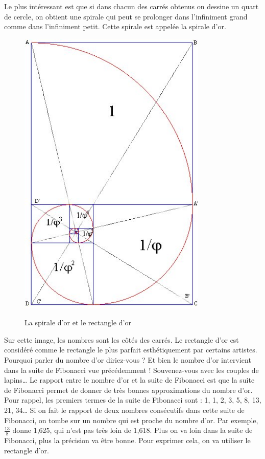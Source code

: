 \documentclass[french,11pt]{report}
\begin{document}
Le plus intéressant est que si dans chacun des carrés obtenus on dessine un quart de cercle, on obtient une spirale qui peut se prolonger dans l’infiniment grand comme dans l’infiniment petit. Cette spirale est appelée la spirale d’or.
\vspace*{60mm}
\begin{figure} [!h]
    \centering
    \includegraphics[width=9cm]{spirale_or}
    \label{fig:spirale_or}
    \caption{La spirale d'or et le rectangle d'or}
\end{figure}


Sur cette image, les nombres sont les côtés des carrés. Le rectangle d’or est considéré comme le rectangle le plus parfait esthétiquement par certains artistes.\\

Pourquoi parler du nombre d’or diriez-vous ? Et bien le nombre d’or intervient dans la suite de Fibonacci vue précédemment ! Souvenez-vous avec les couples de lapins… 
Le rapport entre le nombre d’or et la suite de Fibonacci est que la suite de Fibonacci permet de donner de très bonnes approximations du nombre d’or.  Pour rappel, les premiers termes de la suite de Fibonacci sont : 1, 1, 2, 3, 5, 8, 13, 21, 34… Si on fait le rapport de deux nombres consécutifs dans cette suite de Fibonacci, on tombe sur un nombre qui est proche du nombre d’or. Par exemple, \begin{math}\frac{13}{8}\end{math} donne 1,625, qui n'est pas très loin de 1,618. Plus on va loin dans la suite de Fibonacci, plus la précision va être bonne. Pour exprimer cela, on va utiliser le rectangle d’or.\\
\end{document}
